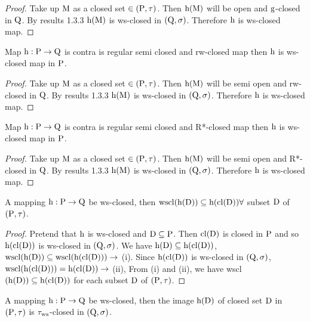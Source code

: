 \begin{proof}
Take up $\mathrm{M}$ as a closed set $\in (\mathrm{P}, \tau)$. Then $\mathrm{h} (\mathrm{M})$ will be open and $\mathrm{g}$-closed in $\mathrm{Q}$. By results 1.3.3 $\mathrm{h} (\mathrm{M})$ is ws-closed in $(\mathrm{Q}, \sigma)$. Therefore $\mathrm{h}$ is ws-closed map.
\end{proof}

\begin{thm}\label{thm4.2.26}
Map $\mathrm{h}: \mathrm{P} \to \mathrm{Q}$ is contra is regular semi closed and rw-closed map then $\mathrm{h}$ is ws-closed map in $\mathrm{P}$.
\end{thm}

\begin{proof}
Take up $\mathrm{M}$ as a closed set $\in(\mathrm{P}, \tau)$. Then $\mathrm{h} (\mathrm{M})$ will be semi open and rw-closed in $\mathrm{Q}$. By results 1.3.3 $\mathrm{h} (\mathrm{M})$ is ws-closed in $(\mathrm{Q}, \sigma)$. Therefore $\mathrm{h}$ is ws-closed map.
\end{proof}

\begin{thm}\label{thm4.2.27}
Map $\mathrm{h}: \mathrm{P} \to \mathrm{Q}$ is contra is regular semi closed and R*-closed map then $\mathrm{h}$ is ws-closed map in $\mathrm{P}$.
\end{thm}

\begin{proof}
Take up $\mathrm{M}$ as a closed set $\in (\mathrm{P}, \tau)$. Then $\mathrm{h} (\mathrm{M})$ will be semi open and R*-closed in $\mathrm{Q}$. By results 1.3.3 $\mathrm{h} (\mathrm{M})$ is ws-closed in $(\mathrm{Q}, \sigma)$. Therefore $\mathrm{h}$ is ws-closed map.
\end{proof}

\begin{thm}\label{thm4.2.28}
A mapping $\mathrm{h}: \mathrm{P} \to \mathrm{Q}$ be ws-closed, then $\mathrm{wscl} (\mathrm{h}(\mathrm{D}))\subseteq \mathrm{h}(\mathrm{cl} (\mathrm{D})) \forall$ subset $\mathrm{D}$ of $(\mathrm{P}, \tau)$.
\end{thm}

\begin{proof}
Pretend that $\mathrm{h}$ is ws-closed and $\mathrm{D} \subseteq \mathrm{P}$. Then $\mathrm{cl}(\mathrm{D})$ is closed in $\mathrm{P}$ and so $\mathrm{h}(\mathrm{cl}(\mathrm{D}))$ is ws-closed in $(\mathrm{Q}, \sigma)$. We have $\mathrm{h}(\mathrm{D}) \subseteq \mathrm{h}(\mathrm{cl}(\mathrm{D}))$, $\wscl(\TSh(\clrD)) \subseteq \wscl(\TSh(\cl(\clrD)))\break \to$ (i). Since $\mathrm{h}(\mathrm{cl}(\mathrm{D}))$ is ws-closed in $(\mathrm{Q}, \sigma)$, $\mathrm{wscl}(\mathrm{h}(\mathrm{cl}(\mathrm{D}))) = \mathrm{h} (\mathrm{cl} (\mathrm{D})) \to$ (ii), From (i) and (ii), we have wscl $(\mathrm{h}(\mathrm{D})) \subseteq \mathrm{h}(\mathrm{cl}(\mathrm{D}))$ for each subset $\mathrm{D}$ of $(\mathrm{P}, \tau)$.
\end{proof}

\begin{coro}\label{coro4.2.29}
A mapping $\mathrm{h}: \mathrm{P} \to \mathrm{Q}$ be ws-closed, then the image $\mathrm{h}(\mathrm{D})$ of closed set $\mathrm{D}$ in $(\mathrm{P}, \tau)$ is $\tau_{\mathrm{ws}}$-closed in $(\mathrm{Q}, \sigma)$.
\end{coro}

